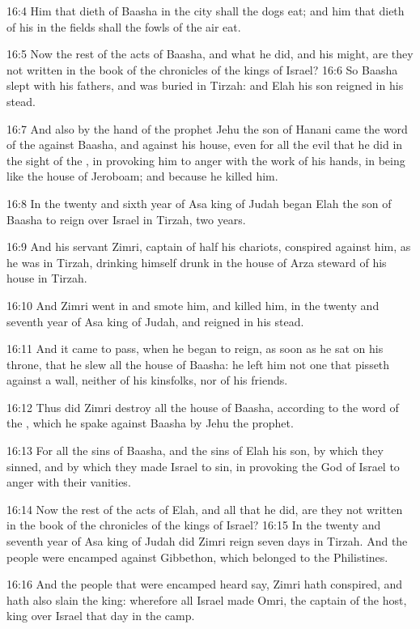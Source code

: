 16:4 Him that dieth of Baasha in the city shall the dogs eat; and him
that dieth of his in the fields shall the fowls of the air eat.

16:5 Now the rest of the acts of Baasha, and what he did, and his
might, are they not written in the book of the chronicles of the kings
of Israel?  16:6 So Baasha slept with his fathers, and was buried in
Tirzah: and Elah his son reigned in his stead.

16:7 And also by the hand of the prophet Jehu the son of Hanani came
the word of the \LORD against Baasha, and against his house, even for
all the evil that he did in the sight of the \LORD, in provoking him to
anger with the work of his hands, in being like the house of Jeroboam;
and because he killed him.

16:8 In the twenty and sixth year of Asa king of Judah began Elah the
son of Baasha to reign over Israel in Tirzah, two years.

16:9 And his servant Zimri, captain of half his chariots, conspired
against him, as he was in Tirzah, drinking himself drunk in the house
of Arza steward of his house in Tirzah.

16:10 And Zimri went in and smote him, and killed him, in the twenty
and seventh year of Asa king of Judah, and reigned in his stead.

16:11 And it came to pass, when he began to reign, as soon as he sat
on his throne, that he slew all the house of Baasha: he left him not
one that pisseth against a wall, neither of his kinsfolks, nor of his
friends.

16:12 Thus did Zimri destroy all the house of Baasha, according to the
word of the \LORD, which he spake against Baasha by Jehu the prophet.

16:13 For all the sins of Baasha, and the sins of Elah his son, by
which they sinned, and by which they made Israel to sin, in provoking
the \LORD God of Israel to anger with their vanities.

16:14 Now the rest of the acts of Elah, and all that he did, are they
not written in the book of the chronicles of the kings of Israel?
16:15 In the twenty and seventh year of Asa king of Judah did Zimri
reign seven days in Tirzah. And the people were encamped against
Gibbethon, which belonged to the Philistines.

16:16 And the people that were encamped heard say, Zimri hath
conspired, and hath also slain the king: wherefore all Israel made
Omri, the captain of the host, king over Israel that day in the camp.

